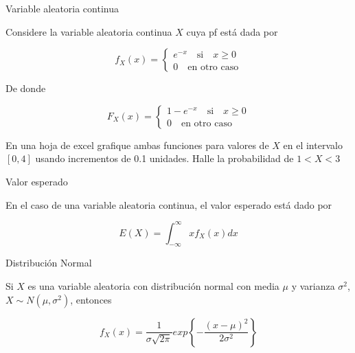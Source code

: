 \documentclass{beamer}
\begin{document}
\begin{frame}{Variable aleatoria continua}

Considere la variable aleatoria continua $X$ cuya pf está dada por

\begin{equation*}
    f_X(x)=
    \begin{cases}
        e^{-x} \quad \text{si} \quad x\geq 0\\
        0 \quad \text{en otro caso}
    \end{cases}
\end{equation*}

De donde 

\begin{equation*}
    F_X(x)=
    \begin{cases}
        1-e^{-x} \quad \text{si} \quad x\geq 0\\
        0 \quad \text{en otro caso}
    \end{cases}
\end{equation*}

En una hoja de excel grafique ambas funciones para valores de $X$ en el intervalo $[0,4]$ usando incrementos de 0.1 unidades. Halle la probabilidad de $1<X<3$
    
\end{frame}

\begin{frame}{Valor esperado}

En el caso de una variable aleatoria continua, el valor esperado está dado por

\begin{equation*}
    E(X)=\int_{-\infty}^{\infty}xf_X(x)dx
\end{equation*}
    
\end{frame}

\begin{frame}{Distribución Normal}

Si $X$ es una variable aleatoria con distribución normal con media $\mu$ y varianza $\sigma^2$, $X\sim N(\mu,\sigma^2)$, entonces

\begin{equation*}
    f_X(x)=\dfrac{1}{\sigma\sqrt{2\pi}}exp\left\{-\dfrac{(x-\mu)^2}{2\sigma^2}\right\}
\end{equation*}
    
\end{frame}
\end{document}
